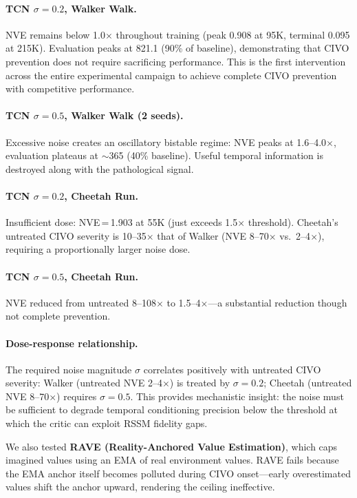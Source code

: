 \documentclass[10pt,letterpaper]{article}
\begin{document}
\paragraph{TCN $\sigma=0.2$, Walker Walk.}
NVE remains below 1.0$\times$ throughout training (peak 0.908 at 95K, terminal 0.095 at 215K).
Evaluation peaks at 821.1 (90\% of baseline), demonstrating that CIVO prevention does not require sacrificing performance.
This is the first intervention across the entire experimental campaign to achieve complete CIVO prevention with competitive performance.

\paragraph{TCN $\sigma=0.5$, Walker Walk (2 seeds).}
Excessive noise creates an oscillatory bistable regime: NVE peaks at 1.6--4.0$\times$, evaluation plateaus at $\sim$365 (40\% baseline).
Useful temporal information is destroyed along with the pathological signal.

\paragraph{TCN $\sigma=0.2$, Cheetah Run.}
Insufficient dose: NVE\,=\,1.903 at 55K (just exceeds 1.5$\times$ threshold).
Cheetah's untreated CIVO severity is 10--35$\times$ that of Walker (NVE 8--70$\times$ vs.\ 2--4$\times$), requiring a proportionally larger noise dose.

\paragraph{TCN $\sigma=0.5$, Cheetah Run.}
NVE reduced from untreated 8--108$\times$ to 1.5--4$\times$---a substantial reduction though not complete prevention.

\paragraph{Dose-response relationship.}
The required noise magnitude $\sigma$ correlates positively with untreated CIVO severity:
Walker (untreated NVE 2--4$\times$) is treated by $\sigma=0.2$;
Cheetah (untreated NVE 8--70$\times$) requires $\sigma=0.5$.
This provides mechanistic insight: the noise must be sufficient to degrade temporal conditioning precision below the threshold at which the critic can exploit RSSM fidelity gaps.

We also tested \textbf{RAVE (Reality-Anchored Value Estimation)}, which caps imagined values using an EMA of real environment values.
RAVE fails because the EMA anchor itself becomes polluted during CIVO onset---early overestimated values shift the anchor upward, rendering the ceiling ineffective.
\end{document}
